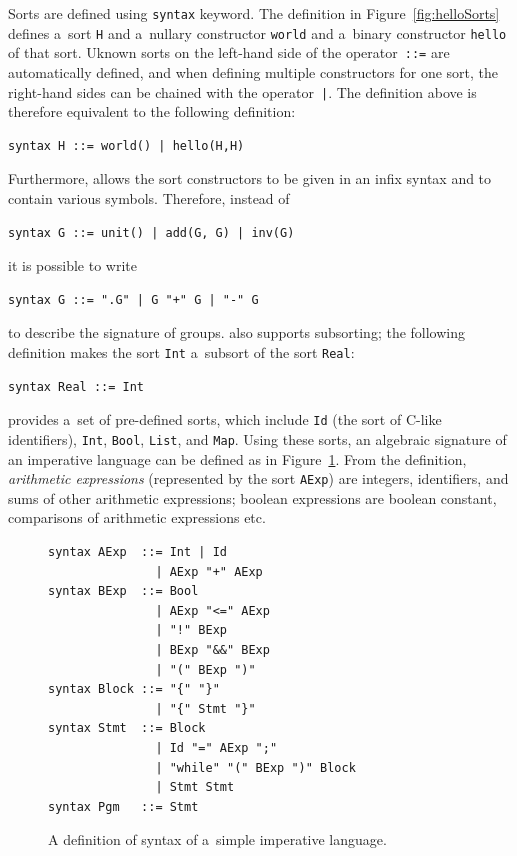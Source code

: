 \documentclass[nolot,nolof,nocover,printed]{fithesis3}
\begin{document}
Sorts are defined using \lstinline|syntax| keyword. The definition in Figure~\ref{fig:helloSorts} defines a~sort \lstinline|H| and a~nullary constructor \lstinline|world| and a~binary constructor \lstinline|hello| of that sort. Uknown sorts on the left-hand side of the operator~\lstinline|::=| are automatically defined, and when defining multiple constructors for one sort, the right-hand sides can be chained with the operator~\lstinline{|}{}. The definition above is therefore equivalent to the following definition:
\begin{lstlisting}
syntax H ::= world() | hello(H,H)
\end{lstlisting}
Furthermore, \K allows the sort constructors to be given in an infix syntax and to contain various symbols. Therefore, instead of
\begin{lstlisting}
syntax G ::= unit() | add(G, G) | inv(G)
\end{lstlisting}
it is possible to write
\begin{lstlisting}
syntax G ::= ".G" | G "+" G | "-" G
\end{lstlisting}
to describe the signature of groups. \K also supports subsorting; the following definition makes the sort \lstinline|Int| a~subsort of the sort \lstinline|Real|:
\begin{lstlisting}
syntax Real ::= Int
\end{lstlisting}

\K provides a~set of pre-defined sorts, which include \lstinline|Id| (the sort of C-like identifiers), \lstinline|Int|, \lstinline|Bool|, \lstinline|List|, and \lstinline|Map|. Using these sorts, an algebraic signature of an imperative language can be defined as in Figure~\ref{impSyntax}. From the definition, \textit{arithmetic expressions} (represented by the sort \lstinline|AExp|) are integers, identifiers, and sums of other arithmetic expressions; boolean expressions are boolean constant, comparisons of arithmetic expressions etc.

\begin{figure}[ht]
\begin{lstlisting}
syntax AExp  ::= Int | Id
               | AExp "+" AExp
syntax BExp  ::= Bool
               | AExp "<=" AExp
               | "!" BExp
               | BExp "&&" BExp
               | "(" BExp ")"
syntax Block ::= "{" "}"
               | "{" Stmt "}"
syntax Stmt  ::= Block
               | Id "=" AExp ";"
               | "while" "(" BExp ")" Block
               | Stmt Stmt
syntax Pgm   ::= Stmt
\end{lstlisting}
\caption{A definition of syntax of a~simple imperative language.}
\label{impSyntax}
\end{figure}
\end{document}
